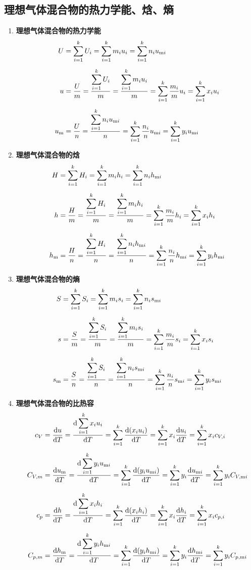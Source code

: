\subsection{理想气体混合物的热力学能、焓、熵}
\begin{enumerate}[1.]
	\item \textbf{理想气体混合物的热力学能}
	\begin{align}
		U &= \sum_{i = 1}^k U_i = \sum_{i = 1}^k m_i u_i = \sum_{i = 1}^k n_i u_{\text{m} i}\\[0.5em]
		u &= \dfrac{U}{m} = \dfrac{\displaystyle \sum_{i = 1}^k U_i}{m} = \dfrac{\displaystyle \sum_{i = 1}^k m_i u_i}{m} = \sum_{i = 1}^{k} \dfrac{m_i}{m} u_i = \sum_{i = 1}^k x_i u_i\\[0.5em]
		u_{\text{m}} &= \dfrac{U}{n} = \dfrac{\displaystyle \sum_{i = 1}^k n_i u_{\text{m} i}}{n} = \sum_{i = 1}^k \dfrac{n_i}{n} u_{\text{m} i} = \sum_{i = 1}^k y_i u_{\text{m} i}
	\end{align}
	
	\item \textbf{理想气体混合物的焓}
	\begin{align}
		H & = \sum_{i = 1}^k H_i = \sum_{i = 1}^k m_ih_i = \sum_{i = 1}^k n_i h_{\text{m} i}\\[0.5em]
		h & = \dfrac{H}{m} = \dfrac{\displaystyle \sum_{i = 1}^k H_i}{m} = \dfrac{\displaystyle \sum_{i = 1}^k m_i h_i}{m} = \sum_{i = 1}^k \dfrac{m_i}{m} h_i = \sum_{i = 1}^k x_i h_i \\[0.5em]
		h_{\text{m}} &= \dfrac{H}{n} = \dfrac{\displaystyle \sum_{i = 1}^k H_i}{n} = \dfrac{\displaystyle \sum_{i = 1}^k n_i h_{\text{m} i}}{n} = \sum_{i = 1}^k \dfrac{n_i}{n} h_{\text{m} i} = \sum_{i = 1}^k y_i h_{\text{m} i}
	\end{align}
	
	\item \textbf{理想气体混合物的熵}
	\begin{align}
		S & = \sum_{i = 1}^k S_i = \sum_{i = 1}^k m_is_i = \sum_{i = 1}^k n_i s_{\text{m} i}\\[0.5em]
		s &= \dfrac{S}{m} = \dfrac{\displaystyle \sum_{i = 1}^k S_i}{m} = \dfrac{\displaystyle \sum_{i = 1}^k m_is_i}{m} = \sum_{i = 1}^k \dfrac{m_i}{m} s_i = \sum_{i = 1}^k x_is_i\\[0.5em]
		s_{\text{m}} &= \dfrac{S}{n} = \dfrac{\displaystyle \sum_{i = 1}^k S_i}{n} = \dfrac{\displaystyle \sum_{i = 1}^k n_is_{\text{m} i}}{n} = \sum_{i = 1}^k \dfrac{n_i}{n} s_{\text{m} i} = \sum_{i = 1}^k y_i s_{\text{m} i}
	\end{align}
	
	\item \textbf{理想气体混合物的比热容}
	\begin{align}
		c_V &= \dfrac{{\rm{d}} u}{{\rm{d}} T} = \dfrac{{\rm{d}} \displaystyle \sum_{i = 1}^k x_i u_i}{{\rm{d}} T} = \sum_{i = 1}^k \dfrac{{\rm{d}} (x_i u_i)}{{\rm{d}} T} = \sum_{i = 1}^k x_i \dfrac{{\rm{d}} u_i}{{\rm{d}} T} = \sum_{i = 1}^k x_i c_{V, i}\\[0.5em]
		C_{V, m} &= \dfrac{{\rm{d}} u_{\text{m}}}{{\rm{d}} T} = \dfrac{{\rm{d}} \displaystyle \sum_{i = 1}^k y_i u_{\text{m} i}}{{\rm{d}} T} = \sum_{i = 1}^k \dfrac{{\rm{d}} (y_i u_{\text{m} i})}{{\rm{d}} T} = \sum_{i = 1}^k y_i \dfrac{{\rm{d}} u_{\text{m} i}}{{\rm{d}} T} = \sum_{i = 1}^k y_i C_{V, \text{m} i}\\[0.5em]
		c_p & = \dfrac{{\rm{d}} h}{{\rm{d}} T} = \dfrac{{\rm{d}} \displaystyle \sum_{i = 1}^k x_i h_{ i}}{{\rm{d}} T} = \sum_{i = 1}^k \dfrac{{\rm{d}} (x_i h_i)}{{\rm{d}} T}  = \sum_{i = 1}^k x_i \dfrac{{\rm{d}} h_i }{{\rm{d}} T} = \sum_{i = 1}^k x_i c_{p , i}\\[0.5em]
		C_{p, m} &= \dfrac{{\rm{d}} h_{\text{m}}}{{\rm{d}} T} = \dfrac{{\rm{d}} \displaystyle \sum_{i = 1}^k y_i h_{\text{m} i}}{{\rm{d}} T} = \sum_{i = 1}^k \dfrac{{\rm{d}} (y_i h_{\text{m} i})}{{\rm{d}} T} = \sum_{i = 1}^k y_i \dfrac{{\rm{d}} h_{\text{m} i}}{{\rm{d}} T} = \sum_{i = 1}^k y_i C_{p, \text{m} i} 
	\end{align}
\end{enumerate}

